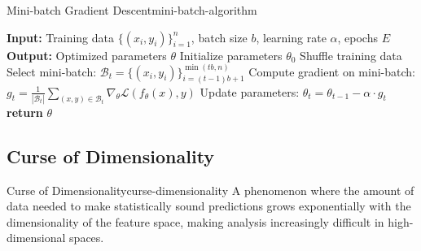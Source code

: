 \documentclass[12pt]{article}
\begin{document}
\begin{algorithmenv}{Mini-batch Gradient Descent}{mini-batch-algorithm}
\begin{algorithmic}[1]
\State \textbf{Input:} Training data $\{(x_i, y_i)\}_{i=1}^n$, batch size $b$, learning rate $\alpha$, epochs $E$
\State \textbf{Output:} Optimized parameters $\theta$
\State Initialize parameters $\theta_0$
    \State Shuffle training data
        \State Select mini-batch: $\mathcal{B}_t = \{(x_i, y_i)\}_{i=(t-1)b+1}^{\min(tb, n)}$
        \State Compute gradient on mini-batch: $g_t = \frac{1}{|\mathcal{B}_t|} \sum_{(x,y) \in \mathcal{B}_t} \nabla_\theta \mathcal{L}(f_\theta(x), y)$
        \State Update parameters: $\theta_t = \theta_{t-1} - \alpha \cdot g_t$
    \EndFor
\EndFor
\State \textbf{return} $\theta$
\end{algorithmic}
\end{algorithmenv}

\subsection{Curse of Dimensionality}

\begin{definition}{Curse of Dimensionality}{curse-dimensionality}
A phenomenon where the amount of data needed to make statistically sound predictions grows exponentially with the dimensionality of the feature space, making analysis increasingly difficult in high-dimensional spaces.
\end{definition}
\end{document}
